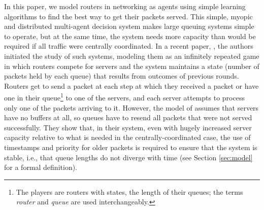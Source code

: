 
In this paper, we model routers in networking as agents using simple learning algorithms to find the best way to get their packets served. This simple, myopic and distributed multi-agent decision system makes large queuing systems simple to operate, but at the same time, the system needs more capacity than would be required if all traffic were centrally coordinated. In a recent paper, \cite{DBLP:conf/sigecom/GaitondeT20,DBLP:journals/jacm/GaitondeT23}, the authors initiated the study of such systems, modeling them as an infinitely repeated game in which routers compete for servers and the system maintains a state (number of packets held by each queue) that results from outcomes of previous rounds. Routers get to send a packet at each step at which they received a packet or have one in their queue\footnote{The players are routers with states, the length of their queues; the terms {\em router} and {\em queue} are used interchangeably.} to one of the servers, and 
each server attempts to process only one of the packets arriving to it. However, the model of \cite{DBLP:conf/sigecom/GaitondeT20,DBLP:journals/jacm/GaitondeT23} assumes that servers have no buffers at all, so queues have to resend all packets that were not served successfully.  They show that, in their system, even with hugely increased server capacity relative to what is needed in the centrally-coordinated case, 
the use of timestamps and priority for older packets is required to ensure that the system is stable, 
i.e., that queue lengths do not diverge with time (see Section \ref{sec:model} for a formal definition). 

